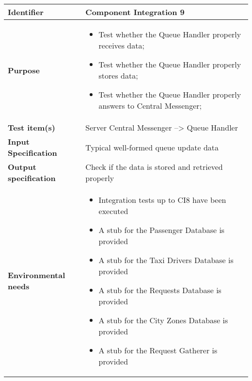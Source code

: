 \begin{center}
\begin{tabular}{lp{}}
\toprule
\textbf{Identifier}		&	Component Integration 9\\
\midrule
\textbf{Purpose}		&	\begin{itemize}
					\item Test whether the Queue Handler properly receives data;
					\item Test whether the Queue Handler properly stores data; 
					\item Test whether the Queue Handler properly answers to Central Messenger;
					\end{itemize}	\\
\textbf{Test item(s)}	&	Server Central Messenger --> Queue Handler\\
\textbf{Input Specification}	&	Typical well-formed queue update data\\
\textbf{Output specification}	&	Check if the data is stored and retrieved properly\\
\textbf{Environmental needs}	&	\begin{itemize}
							\item Integration tests up to CI8 have been executed
							\item A stub for the Passenger Database is provided
							\item A stub for the Taxi Drivers Database is provided
							\item A stub for the Requests Database is provided
							\item A stub for the City Zones Database is provided
							\item A stub for the Request Gatherer is provided
							\end{itemize}	\\
\bottomrule
\end{tabular}
\end{center}




